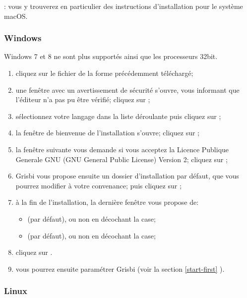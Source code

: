 \Note{}: vous y trouverez en particulier des instructions d'installation pour le système macOS.

\subsubsection{Windows\label{start-install-stable-windows}}

Windows 7 et 8 ne sont plus supportés ainsi que les processeurs 32bit.

\begin{enumerate}
	\item cliquez sur le fichier de la forme  précédemment téléchargé;
	\item une fenêtre avec un avertissement de sécurité s'ouvre, vous informant que l'éditeur n'a pas pu être vérifié; cliquez sur ;
	\item sélectionnez votre langage dans la liste déroulante puis cliquez sur ;
	\item la fenêtre de bienvenue de l'installation s'ouvre; cliquez sur ;
	\item la fenêtre suivante vous demande si vous acceptez la \gls{Licence Publique Generale GNU} (GNU General Public License) Version 2; cliquez sur ;
	\item Grisbi vous propose ensuite un dossier d'installation par défaut, que vous pourrez modifier à votre convenance; puis cliquez sur ;
	\item à la fin de l'installation, la dernière fenêtre vous propose de:
		\begin{itemize}
			\item {} (par défaut), ou non en décochant la case;
			\item {} (par défaut), ou non en décochant la case;
		\end{itemize}
	\item cliquez sur .
	\item vous pourrez ensuite paramétrer Grisbi (voir la section \vref{start-first} ).
\end{enumerate}

\subsubsection{Linux\label{start-install-stable-linux}}

